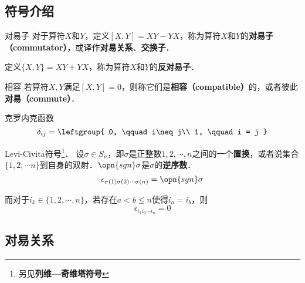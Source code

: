 


\subsection{符号介绍}

\begin{definition}{对易子}\label{ComOpQ_def13}
对于算符$X$和$Y$，定义$[X, Y]=XY-YX$，称为算符$X$和$Y$的\textbf{对易子（commutator）}，或译作\textbf{对易关系}、\textbf{交换子}．

定义$\{X, Y\}=XY+YX$，称为算符$X$和$Y$的\textbf{反对易子}．
\end{definition}


\begin{definition}{相容}\label{ComOpQ_def17}
若算符$X, Y$满足$[X, Y]=0$，则称它们是\textbf{相容（compatible）}的，或者彼此\textbf{对易（commute）}．
\end{definition}



\begin{definition}{克罗内克函数}
\begin{equation}
\delta_{ij} = \leftgroup{
    0, \qquad i\neq j\\
    1, \qquad i = j
}
\end{equation}
\end{definition}




\begin{definition}{Levi-Civita符号\footnote{另见\textbf{列维—奇维塔符号}}．}
设$\sigma\in S_n$，即$\sigma$是正整数$1, 2, \cdots, n$之间的一个\textbf{置换}，或者说集合$\{1, 2, \cdots n\}$到自身的双射．$\opn{sgn}\sigma$是$\sigma$的\textbf{逆序数}．
\begin{equation}
\epsilon_{\sigma(1) \sigma(2) \cdots \sigma(n)}=\opn{sgn}\sigma
\end{equation}

而对于$i_k\in\{1, 2, \cdots, n\}$，若存在$a<b\leq n$使得$i_a=i_b$，则
\begin{equation}
\epsilon_{i_1 i_2 \cdots i_n} = 0
\end{equation}

\end{definition}


\subsection{对易关系}


